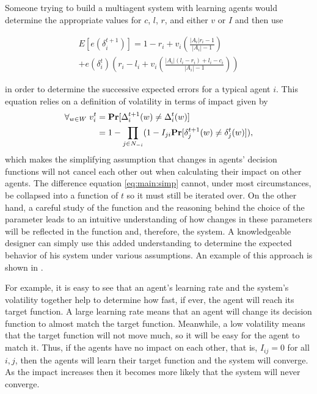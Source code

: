 Someone trying to build a multiagent system with learning agents would
determine the appropriate values for $c$, $l$, $r$, and either $v$ or
$I$ and then use 

\begin{multline}
  \label{eq:main:simp}
  E[e(\delta_i^{t+1})] = 1 - r_i + v_i
  \left(
    \frac{|A_i|r_i - 1}{|A_i| -1}
  \right) \\
  + e(\delta_i^t)
  \left(
    r_i -l_i + v_i
    \left(
      \frac{|A_i|(l_i - r_i) + l_i - c_i}{|A_i| -1}
    \right)
  \right)
\end{multline}

in order to determine the successive expected errors for a typical
agent $i$. This equation relies on a definition of volatility in terms
of impact given by
\begin{equation}
  \label{eq:16}
  \begin{split}
    \forall_{w \in W} \; v_{i}^{t} &= \mathbf{Pr}[\Delta_i^{t+1}(w) \neq \Delta_i^t(w)] \\
    &= 1 - \prod_{j \in N_{-i}}(1 - I_{ji} \mathbf{Pr}[\delta_j^{t+1}(w) \neq \delta_j^t(w)]), \\
  \end{split}
\end{equation}
which makes the simplifying assumption that changes in agents'
decision functions will not cancel each other out when calculating
their impact on other agents. The difference equation
\eqref{eq:main:simp} cannot, under most circumstances, be collapsed
into a function of $t$ so it must still be iterated over.  On the
other hand, a careful study of the function and the reasoning behind
the choice of the  parameter leads to an intuitive
understanding of how changes in these parameters will be reflected in
the function and, therefore, the system. A knowledgeable designer can
simply use this added understanding to determine the expected behavior
of his system under various assumptions. An example of this approach
is shown in \cite{brooks02a}.

For example, it is easy to see that an agent's learning rate and the
system's volatility together help to determine how fast, if ever, the
agent will reach its target function. A large learning rate means that
an agent will change its decision function to almost match the target
function. Meanwhile, a low volatility means that the target function
will not move much, so it will be easy for the agent to match it.
Thus, if the agents have no impact on each other, that is, $I_{ij} =
0$ for all $i,j$, then the agents will learn their target function and
the system will converge. As the impact increases then it becomes more
likely that the system will never converge.  

